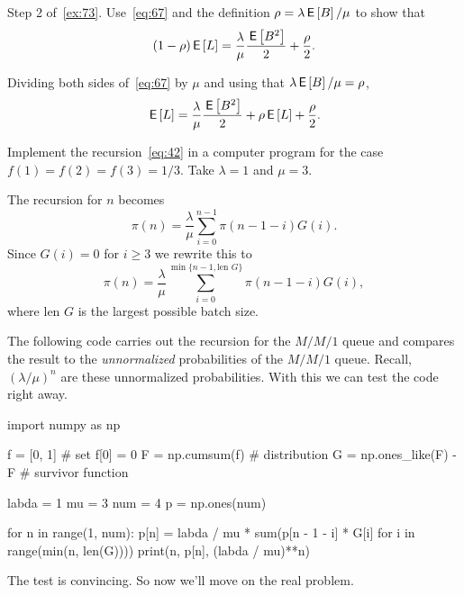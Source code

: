 \begin{extra}
 Step 2 of~\cref{ex:73}.
 Use~\cref{eq:67} and the definition $\rho=\lambda \,\mathsf{E}\left[B\right]/\mu$ to show that
\begin{equation*}
(1- \rho) \,\mathsf{E}\left[L\right] = \frac{\lambda}\mu \frac{\,\mathsf{E}\left[B^2\right]}2 + \frac\rho2.
\end{equation*}
\begin{solution}
 Dividing both sides of~\cref{eq:67} by $\mu$ and using that $\lambda \,\mathsf{E}\left[B\right]/\mu = \rho$,
\begin{equation*}
 \,\mathsf{E}\left[L\right] = \frac{\lambda}{\mu} \frac{\,\mathsf{E}\left[B^2\right]}2 + \rho \,\mathsf{E}\left[L\right] + \frac\rho2.
\end{equation*}
\end{solution}
\end{extra}



\begin{exercise}
 Implement the recursion~\cref{eq:42} in a computer program for the case $f(1)=f(2)=f(3)=1/3$.
 Take $\lambda =1$ and $\mu = 3$.
\begin{solution}
 The recursion for $n$ becomes
\begin{equation*}
\pi(n) = \frac \lambda \mu \sum_{i=0}^{n-1} \pi(n-1-i)G(i).
\end{equation*}
Since $G(i) =0$ for $i\geq 3$ we rewrite this to 
\begin{equation*}
 \pi(n) = \frac\lambda \mu \sum_{i=0}^{\min\{n-1,\text{len } G\}} \pi(n-1-i)G(i),
\end{equation*}
where $\text{len } G$ is the largest possible batch size.

The following code carries out the recursion for the $M/M/1$ queue and compares the result to the \emph{unnormalized} probabilities of the $M/M/1$ queue.
Recall, $(\lambda/\mu)^n$ are these unnormalized probabilities.
With this we can test the code right away.

\begin{pyconsole}
import numpy as np

f = [0, 1] # set f[0] = 0
F = np.cumsum(f) # distribution 
G = np.ones_like(F) - F # survivor function

labda = 1
mu = 3
num = 4
p = np.ones(num)

for n in range(1, num):
 p[n] = labda / mu * sum(p[n - 1 - i] * G[i] for i in range(min(n, len(G))))
 print(n, p[n], (labda / mu)**n)

\end{pyconsole}
The test is convincing. So now we'll move on the real problem. 


\end{solution}
\end{exercise}
